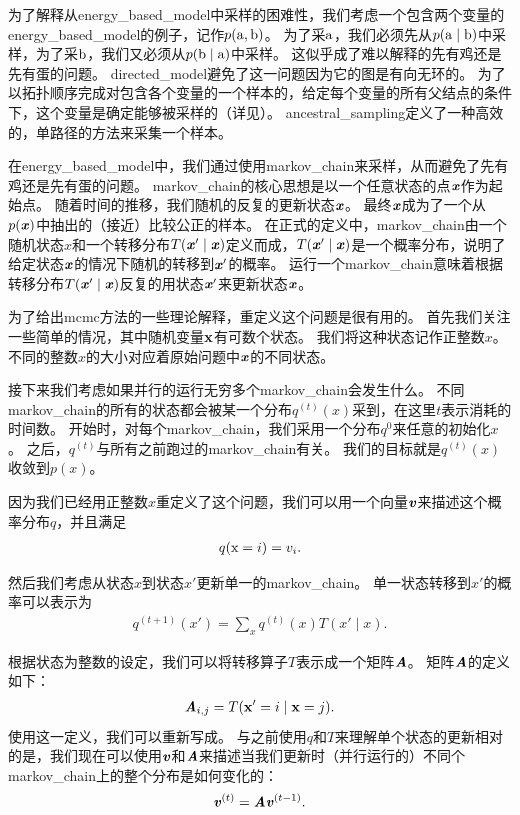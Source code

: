 为了解释从\gls{energy_based_model}中采样的困难性，我们考虑一个包含两个变量的\gls{energy_based_model}的例子，记作$p(\mathrm{a},\mathrm{b})$。
为了采$\mathrm{a}$，我们必须先从$p(\mathrm{a}\mid \mathrm{b})$中采样，为了采$\mathrm{b}$，我们又必须从$p(\mathrm{b}\mid \mathrm{a})$中采样。
这似乎成了难以解释的先有鸡还是先有蛋的问题。
\gls{directed_model}避免了这一问题因为它的图是有向无环的。
为了以拓扑顺序完成对包含各个变量的一个样本的，给定每个变量的所有父结点的条件下，这个变量是确定能够被采样的（详见）。
\gls{ancestral_sampling}定义了一种高效的，单路径的方法来采集一个样本。


在\gls{energy_based_model}中，我们通过使用\gls{markov_chain}来采样，从而避免了先有鸡还是先有蛋的问题。
\gls{markov_chain}的核心思想是以一个任意状态的点$\boldsymbol{\mathit{x}}$作为起始点。
随着时间的推移，我们随机的反复的更新状态$\boldsymbol{\mathit{x}}$。
最终$\boldsymbol{\mathit{x}}$成为了一个从$p(\boldsymbol{\mathit{x}})$中抽出的（接近）比较公正的样本。
在正式的定义中，\gls{markov_chain}由一个随机状态$x$和一个转移分布$T(\boldsymbol{\mathit{x}}'\mid \boldsymbol{\mathit{x}})$定义而成，$T(\boldsymbol{\mathit{x}}'\mid \boldsymbol{\mathit{x}})$是一个概率分布，说明了给定状态$\boldsymbol{\mathit{x}}$的情况下随机的转移到$\boldsymbol{\mathit{x}}'$的概率。
运行一个\gls{markov_chain}意味着根据转移分布$T(\boldsymbol{\mathit{x}}'\mid \boldsymbol{\mathit{x}})$反复的用状态$\boldsymbol{\mathit{x}}'$来更新状态$\boldsymbol{\mathit{x}}$。


为了给出\gls{mcmc}方法的一些理论解释，重定义这个问题是很有用的。
首先我们关注一些简单的情况，其中随机变量$\mathbf{x}$有可数个状态。
我们将这种状态记作正整数$x$。
不同的整数$x$的大小对应着原始问题中$\boldsymbol{\mathit{x}}$的不同状态。


接下来我们考虑如果并行的运行无穷多个\gls{markov_chain}会发生什么。
不同\gls{markov_chain}的所有的状态都会被某一个分布$q^{(t)}(x)$采到，在这里$t$表示消耗的时间数。
开始时，对每个\gls{markov_chain}，我们采用一个分布$q^{{0}}$来任意的初始化$x$。
之后，$q^{(t)}$与所有之前跑过的\gls{markov_chain}有关。
我们的目标就是$q^{(t)}(x)$收敛到$p(x)$。

因为我们已经用正整数$x$重定义了这个问题，我们可以用一个向量$\boldsymbol{\mathit{v}}$来描述这个概率分布$q$，并且满足
\begin{align}
q(\mathrm{x} = i) = v_i.
\end{align}

然后我们考虑从状态$x$到状态$x'$更新单一的\gls{markov_chain}。
单一状态转移到$x'$的概率可以表示为
\begin{align}
\label{eqn:transition1}
q^{(t+1)}(x') = \sum_{x} q^{(t)}(x) T(x'\mid x).
\end{align}


根据状态为整数的设定，我们可以将转移算子$T$表示成一个矩阵$\boldsymbol{\mathit{A}}$。
矩阵$\boldsymbol{\mathit{A}}$的定义如下：
\begin{align}
\boldsymbol{\mathit{A}}_{i,j} = T(\mathbf{x}' = i\mid \mathbf{x} = j).
\end{align}
使用这一定义，我们可以重新写成。
与之前使用$q$和$T$来理解单个状态的更新相对的是，我们现在可以使用$\boldsymbol{\mathit{v}}$和$\boldsymbol{\mathit{A}}$来描述当我们更新时（并行运行的）不同个\gls{markov_chain}上的整个分布是如何变化的：
\begin{align}
\boldsymbol{\mathit{v}}^{(t)} = \boldsymbol{\mathit{A}} \boldsymbol{\mathit{v}}^{(t-1)}.
\end{align}


